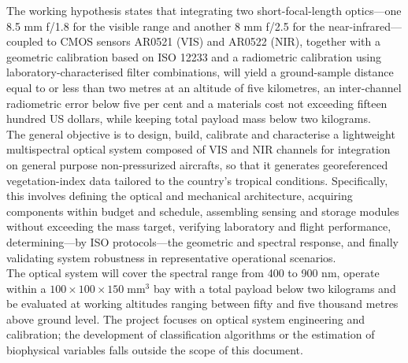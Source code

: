 \noindent The working hypothesis states that integrating two short-focal-length
optics—one 8.5 mm f/1.8 for the visible range and another 8 mm f/2.5 for
the near-infrared—coupled to CMOS sensors AR0521 (VIS) and AR0522 (NIR),
together with a geometric calibration based on ISO 12233 and a
radiometric calibration using laboratory-characterised filter
combinations, will yield a ground-sample distance equal to or less than
two metres at an altitude of five kilometres, an inter-channel
radiometric error below five per cent and a materials cost not exceeding
fifteen hundred US dollars, while keeping total payload mass below two
kilograms.\\

\noindent The general objective is to design, build, calibrate and
characterise a lightweight multispectral optical system composed of VIS and NIR
channels for integration on general purpose non-pressurized aircrafts, so that it generates
georeferenced vegetation-index data tailored to the country's tropical
conditions.  Specifically, this involves defining the optical and
mechanical architecture, acquiring components within budget and
schedule, assembling sensing and storage modules without exceeding the
mass target, verifying laboratory and flight performance, determining—by
ISO protocols—the geometric and spectral response, and finally
validating system robustness in representative operational scenarios.\\

\noindent The optical system will cover the spectral range from 400 to 900 nm, operate
within a \(100\times100\times150\;\text{mm}^3\) bay with a total payload
below two kilograms and be evaluated at working altitudes ranging
between fifty and five thousand metres above ground level.  The project
focuses on optical system engineering and calibration; the development of
classification algorithms or the estimation of biophysical variables
falls outside the scope of this document.\\

